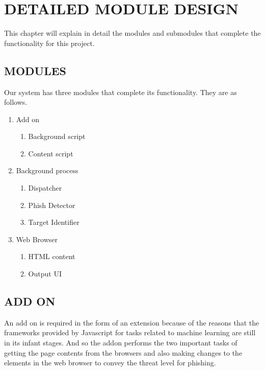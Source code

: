 
\chapter{DETAILED MODULE DESIGN} %
This chapter will explain in detail the modules and submodules that complete the functionality for this project.


\section{MODULES}
Our system has three modules that complete its functionality. They are as follows.

\begin{enumerate}
  \item Add on
  \begin{enumerate}
    \item Background script
    \item Content script
  \end{enumerate}
  \item Background process
  \begin{enumerate}
    \item Dispatcher
    \item Phish Detector
    \item Target Identifier
  \end{enumerate}
  \item Web Browser
  \begin{enumerate}
    \item HTML content
    \item Output UI
  \end{enumerate}
\end{enumerate}

\section{ADD ON}
An add on is required in the form of an extension because of the reasons that the frameworks provided by Javascript for tasks related to machine learning are still in its infant stages. And so the addon performs the two important tasks of getting the page contents from the browsers and also making changes to the elements in the web browser to convey the threat level for phishing.


